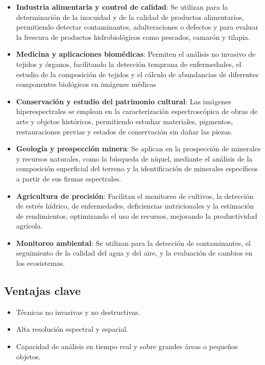 \begin{itemize}
    \item \textbf{Industria alimentaria y control de calidad}:
Se utilizan para la determinación de la inocuidad y de la calidad de productos alimentarios, permitiendo detectar contaminantes, adulteraciones o defectos y para evaluar la frescura de productos hidrobiológicos como pescados, camarón y tilapia.

    \item \textbf{Medicina y aplicaciones biomédicas}:
Permiten el análisis no invasivo de tejidos y órganos, facilitando la detección temprana de enfermedades, el estudio de la composición de tejidos y el cálculo de abundancias de diferentes componentes biológicos en imágenes médicas

    \item \textbf{Conservación y estudio del patrimonio cultural}:
Las imágenes hiperespectrales se emplean en la caracterización espectroscópica de obras de arte y objetos históricos, permitiendo estudiar materiales, pigmentos, restauraciones previas y estados de conservación sin dañar las piezas. 

    \item \textbf{Geología y prospección minera}:
Se aplican en la prospección de minerales y recursos naturales, como la búsqueda de níquel, mediante el análisis de la composición superficial del terreno y la identificación de minerales específicos a partir de sus firmas espectrales.

    \item \textbf{Agricultura de precisión}:
Facilitan el monitoreo de cultivos, la  detección de estrés hídrico, de enfermedades, deficiencias nutricionales y la estimación de rendimientos, optimizando el uso de recursos,  mejorando la productividad agrícola.

    \item \textbf{Monitoreo ambiental}:
Se utilizan para la detección de contaminantes, el seguimiento de la calidad del agua y del aire, y la evaluación de cambios en los ecosistemas.
\end{itemize}

\subsection{Ventajas clave}

\begin{itemize}
    \item Técnicas no invasivas y no destructivas.
    \item Alta resolución espectral y espacial.
    \item Capacidad de análisis en tiempo real y sobre grandes áreas o pequeños objetos.
\end{itemize}

